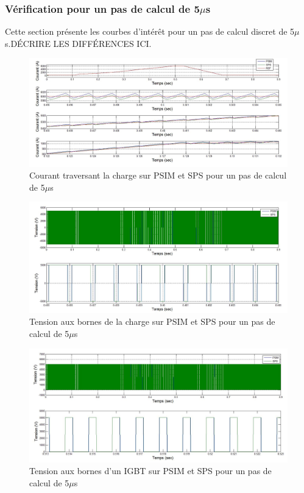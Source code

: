 \documentclass[11pt,letterpaper,final]{report}
\begin{document}
\clearpage
\subsubsection{Vérification pour un pas de calcul de 5$\mu$s}
Cette section présente les courbes d'intérêt pour un pas de calcul discret de 5$\mu$s.DÉCRIRE LES DIFFÉRENCES ICI.

\begin{figure}[htb]
\centering
\includegraphics[scale=0.5]{Fig/Hacheur4Quadrants/HacheurCourantCharge5u.jpg}
\caption{Courant traversant la charge sur PSIM et SPS pour un pas de calcul de 5$\mu$s}
\label{hc_cou_ch_5}
\end{figure}


\begin{figure}[htb]
\centering
\includegraphics[scale=0.5]{Fig/Hacheur4Quadrants/HacheurTensionCharge5u.jpg}
\caption{Tension aux bornes de la charge sur PSIM et SPS pour un pas de calcul de 5$\mu$s}
\label{hc_ten_ch_5}
\end{figure}


\begin{figure}[htb]
\centering
\includegraphics[scale=0.5]{Fig/Hacheur4Quadrants/HacheurTensionIGBT5u.jpg}
\caption{Tension aux bornes d'un IGBT sur PSIM et SPS pour un pas de calcul de 5$\mu$s}
\label{hc_IG_ten_5}
\end{figure}
\end{document}
